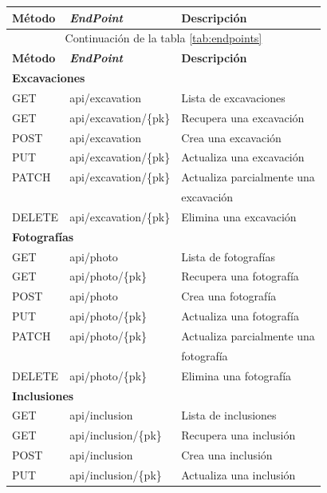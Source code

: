 \begin{longtable}[H]{|l|l|l|}
    \hline
    \textbf{Método} & \textbf{\textit{EndPoint}} & \textbf{Descripción} \\
    \hline
    \endfirsthead
   
    \hline
    \multicolumn{3}{|c|}{Continuación de la tabla \ref{tab:endpoints}}\\
    \hline
    \textbf{Método} & \textbf{\textit{EndPoint}} & \textbf{Descripción} \\
    \hline
    \hline
    \endhead
   
    \hline\hline
    \multicolumn{3}{|l|}{\textbf{Excavaciones}} \\
    \hline
    GET & api/excavation & Lista de excavaciones \\
    GET & api/excavation/\{pk\} & Recupera una excavación\\
    POST & api/excavation & Crea una excavación \\
    PUT & api/excavation/\{pk\} & Actualiza una excavación \\
    PATCH & api/excavation/\{pk\} & Actualiza parcialmente una \\
    &  & excavación \\
    DELETE & api/excavation/\{pk\} & Elimina una excavación \\
    \hline\hline
    \multicolumn{3}{|l|}{\textbf{Fotografías}} \\
    \hline
    GET & api/photo & Lista de fotografías \\
    GET & api/photo/\{pk\} & Recupera una fotografía \\
    POST & api/photo & Crea una fotografía \\
    PUT & api/photo/\{pk\} & Actualiza una fotografía \\
    PATCH & api/photo/\{pk\} & Actualiza parcialmente una \\
    &  & fotografía \\
    DELETE & api/photo/\{pk\} & Elimina una fotografía \\
    \hline\hline
    \multicolumn{3}{|l|}{\textbf{Inclusiones}} \\
    \hline
    GET & api/inclusion & Lista de inclusiones \\
    GET & api/inclusion/\{pk\} & Recupera una inclusión \\
    POST & api/inclusion & Crea una inclusión \\
    PUT & api/inclusion/\{pk\} & Actualiza una inclusión\\

\end{longtable}
